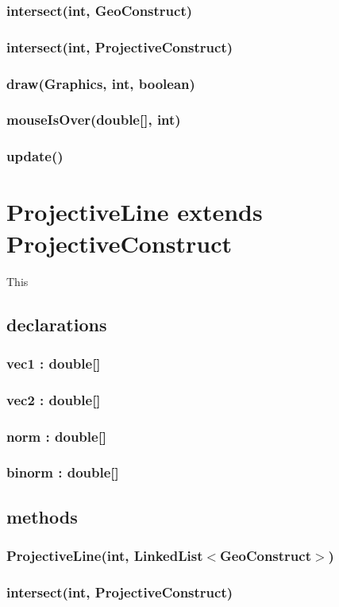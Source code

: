 \documentclass[a4paper,10pt]{report}
\begin{document}
\subsubsection{intersect(int, GeoConstruct)}
\subsubsection{intersect(int, ProjectiveConstruct)}
\subsubsection{draw(Graphics, int, boolean)}
\subsubsection{mouseIsOver(double[], int)}
\subsubsection{update()}
\section{ProjectiveLine extends ProjectiveConstruct} This
\subsection{declarations}
\subsubsection{vec1 : double[]}
\subsubsection{vec2 : double[]}
\subsubsection{norm : double[]}
\subsubsection{binorm : double[]}
\subsection{methods}
\subsubsection{ProjectiveLine(int, LinkedList$<$GeoConstruct$>$)}
\subsubsection{intersect(int, ProjectiveConstruct)}
\end{document}
